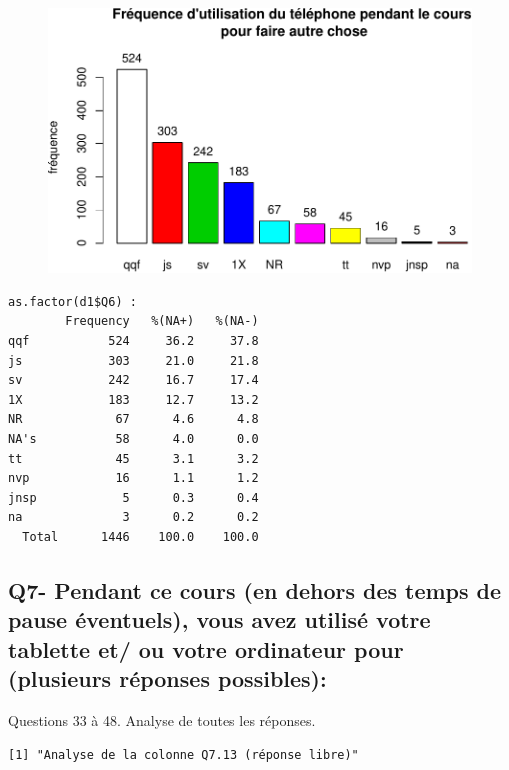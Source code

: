 \documentclass[]{article}
\begin{document}
\begin{figure}[htbp]
\centering
\includegraphics{qs_etudiants_files/figure-latex/utilisation2-1.pdf}
\end{figure}

\begin{verbatim}
as.factor(d1$Q6) : 
        Frequency   %(NA+)   %(NA-)
qqf           524     36.2     37.8
js            303     21.0     21.8
sv            242     16.7     17.4
1X            183     12.7     13.2
NR             67      4.6      4.8
NA's           58      4.0      0.0
tt             45      3.1      3.2
nvp            16      1.1      1.2
jnsp            5      0.3      0.4
na              3      0.2      0.2
  Total      1446    100.0    100.0
\end{verbatim}

\subsection{Q7- Pendant ce cours (en dehors des temps de pause
éventuels), vous avez utilisé votre tablette et/ ou votre ordinateur
pour (plusieurs réponses
possibles):}\label{q7--pendant-ce-cours-en-dehors-des-temps-de-pause-eventuels-vous-avez-utilise-votre-tablette-et-ou-votre-ordinateur-pour-plusieurs-reponses-possibles}

Questions 33 à 48. Analyse de toutes les réponses.

\begin{verbatim}
[1] "Analyse de la colonne Q7.13 (réponse libre)"
\end{verbatim}
\end{document}
